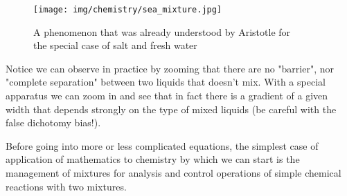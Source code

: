 	\begin{figure}[H]
		\centering
		\texttt{[image: img/chemistry/sea\_mixture.jpg]}	
		\caption[]{A phenomenon that was already understood by Aristotle for\\ the special case of salt and fresh water}
	\end{figure}
	Notice we can observe in practice by zooming that there are no "barrier", nor "complete separation" between two liquids that doesn't mix. With a special apparatus we can zoom in and see that in fact there is a gradient of a given width that depends strongly on the type of mixed liquids (be careful with the false dichotomy bias!).
		
	Before going into more or less complicated equations, the simplest case of application of mathematics to chemistry by which we can start is the management of mixtures for analysis and control operations of simple chemical reactions with two mixtures.
	
